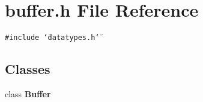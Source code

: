 \section{buffer.h File Reference}
\label{buffer_8h}
{\tt \#include \char`\"{}datatypes.h\char`\"{}}\par
\subsection*{Classes}
\begin{CompactItemize}
\item 
class {\bf Buffer}
\end{CompactItemize}
